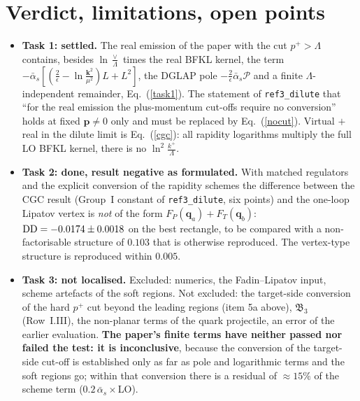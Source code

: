 \documentclass[11pt,a4paper]{article}
\renewcommand{\v}[1]{\bm{#1}}
\newcommand{\ab}{\bar\alpha_s}
\begin{document}
\section{Verdict, limitations, open points}
\begin{itemize}
\item \textbf{Task 1: settled.} The real emission of the paper with the cut $p^+>\Lambda$ contains, besides $\ln\frac{\vee}{\Lambda}$ times the real BFKL kernel, the term $-\ab[(\frac2\epsilon-\ln\frac{\v k^2}{\mu^2})L+L^2]$, the DGLAP pole $-\frac2\epsilon\ab\mathcal P$ and a finite $\Lambda$-independent remainder, Eq.~(\ref{task1}). The statement of \texttt{ref3\_dilute} that ``for the real emission the plus-momentum cut-offs require no conversion'' holds at fixed $\v p\neq0$ only and must be replaced by Eq.~(\ref{nocut}). Virtual $+$ real in the dilute limit is Eq.~(\ref{cgc}): all rapidity logarithms multiply the full LO BFKL kernel, there is no $\ln^2\frac{k^+}{\Lambda}$.
\item \textbf{Task 2: done, result negative as formulated.} With matched regulators and the explicit conversion of the rapidity schemes the difference between the CGC result (Group~I constant of \texttt{ref3\_dilute}, six points) and the one-loop Lipatov vertex is \emph{not} of the form $F_P(\v q_a)+F_T(\v q_b)$: ${\rm DD}=-0.0174\pm0.0018$ on the best rectangle, to be compared with a non-factorisable structure of $0.103$ that is otherwise reproduced. The vertex-type structure is reproduced within $0.005$.
\item \textbf{Task 3: not localised.} Excluded: numerics, the Fadin--Lipatov input, scheme artefacts of the soft regions. Not excluded: the target-side conversion of the hard $p^+$ cut beyond the leading regions (item 5a above), $\mathfrak B_3$ (Row~I.III), the non-planar terms of the quark projectile, an error of the earlier evaluation. \textbf{The paper's finite terms have neither passed nor failed the test: it is inconclusive}, because the conversion of the target-side cut-off is established only as far as pole and logarithmic terms and the soft regions go; within that conversion there is a residual of $\approx15\%$ of the scheme term ($0.2\,\ab\times$LO).
\end{itemize}
\end{document}
